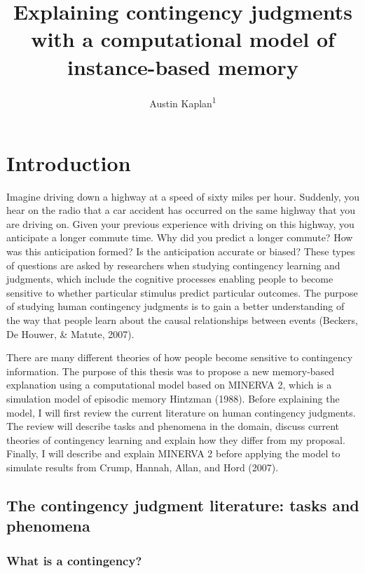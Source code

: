\documentclass[
  english,
  man,floatsintext]{apa6}
\title{Explaining contingency judgments with a computational model of instance-based memory}
\author{Austin Kaplan\textsuperscript{1}}
\date{}
\affiliation{\vspace{0.5cm}\textsuperscript{1} Brooklyn College}
\begin{document}
\maketitle

\hypertarget{introduction}{%
\section{Introduction}\label{introduction}}

Imagine driving down a highway at a speed of sixty miles per hour. Suddenly, you hear on the radio that a car accident has occurred on the same highway that you are driving on. Given your previous experience with driving on this highway, you anticipate a longer commute time. Why did you predict a longer commute? How was this anticipation formed? Is the anticipation accurate or biased? These types of questions are asked by researchers when studying contingency learning and judgments, which include the cognitive processes enabling people to become sensitive to whether particular stimulus predict particular outcomes. The purpose of studying human contingency judgments is to gain a better understanding of the way that people learn about the causal relationships between events (Beckers, De Houwer, \& Matute, 2007).

There are many different theories of how people become sensitive to contingency information. The purpose of this thesis was to propose a new memory-based explanation using a computational model based on MINERVA 2, which is a simulation model of episodic memory Hintzman (1988). Before explaining the model, I will first review the current literature on human contingency judgments. The review will describe tasks and phenomena in the domain, discuss current theories of contingency learning and explain how they differ from my proposal. Finally, I will describe and explain MINERVA 2 before applying the model to simulate results from Crump, Hannah, Allan, and Hord (2007).

\hypertarget{the-contingency-judgment-literature-tasks-and-phenomena}{%
\subsection{The contingency judgment literature: tasks and phenomena}\label{the-contingency-judgment-literature-tasks-and-phenomena}}

\hypertarget{what-is-a-contingency}{%
\subsubsection{What is a contingency?}\label{what-is-a-contingency}}
\end{document}
